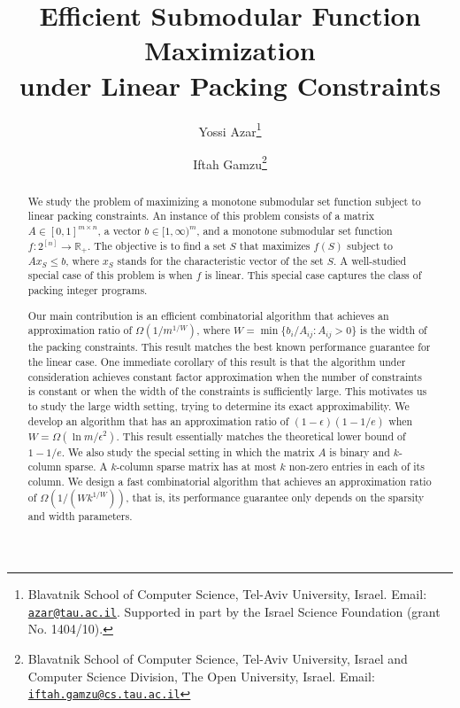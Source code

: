 \documentclass[11pt]{article}
\theoremstyle{plain}
\theoremstyle{definition}
\newcommand{\bbR}{\mathbb{R}}
\begin{document}
\begin{titlepage}
\title{Efficient Submodular Function Maximization\\under Linear Packing Constraints}
\author{
    Yossi Azar\thanks{Blavatnik School of Computer Science, Tel-Aviv
    University, Israel. Email: \href{mailto:azar@tau.ac.il}
    {\tt azar@tau.ac.il}. Supported in part by the Israel Science
    Foundation (grant No. 1404/10).}
    \and
    Iftah Gamzu\thanks{Blavatnik School of Computer Science, Tel-Aviv
    University, Israel and Computer Science Division, The Open University, Israel.
    Email: \href{mailto:iftah.gamzu@cs.tau.ac.il}{\tt iftah.gamzu@cs.tau.ac.il}}
}
\date{}
\maketitle

\begin{abstract}
We study the problem of maximizing a monotone submodular set
function subject to linear packing constraints. An instance of
this problem consists of a matrix $A \in [0,1]^{m \times n}$, a
vector $b \in [1,\infty)^m$, and a monotone submodular set
function $f: 2^{[n]} \rightarrow \bbR_+$. The objective is to find
a set $S$ that maximizes $f(S)$ subject to $A x_{S} \leq b$, where
$x_S$ stands for the characteristic vector of the set $S$. A
well-studied special case of this problem is when $f$ is linear.
This special case captures the class of packing integer programs.

Our main contribution is an efficient combinatorial algorithm that
achieves an approximation ratio of $\Omega(1 / m^{1/W})$, where $W
= \min\{b_i / A_{ij} : A_{ij} > 0\}$ is the width of the packing
constraints. This result matches the best known performance
guarantee for the linear case. One immediate corollary of this
result is that the algorithm under consideration achieves constant
factor approximation when the number of constraints is constant or
when the width of the constraints is sufficiently large. This
motivates us to study the large width setting, trying to determine
its exact approximability. We develop an algorithm that has an
approximation ratio of $(1 - \epsilon)(1 - 1/e)$ when $W =
\Omega(\ln m / \epsilon^2)$. This result essentially matches the
theoretical lower bound of $1 - 1/e$. We also study the special
setting in which the matrix $A$ is binary and $k$-column sparse. A
$k$-column sparse matrix has at most $k$ non-zero entries in each
of its column. We design a fast combinatorial algorithm that
achieves an approximation ratio of $\Omega(1 / (Wk^{1/W}))$, that
is, its performance guarantee only depends on the sparsity and
width parameters.
\end{abstract}

\thispagestyle{empty}
\end{titlepage}
\end{document}
